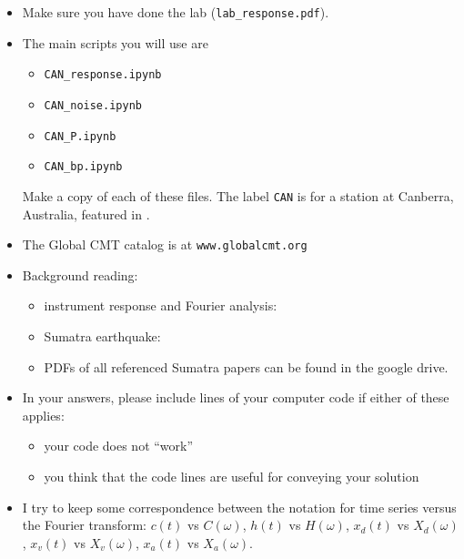 \documentclass[11pt,titlepage,fleqn]{article}
\newcommand{\fft}{h}
\newcommand{\ffw}{H}
\newcommand{\tfileresponse}{{\tt CAN\_response.ipynb}}
\newcommand{\tfilenoise}{{\tt CAN\_noise.ipynb}}
\newcommand{\tfileP}{{\tt CAN\_P.ipynb}}
\newcommand{\tfilebp}{{\tt CAN\_bp.ipynb}}
\begin{document}
\begin{itemize}

\item Make sure you have done the lab (\verb+lab_response.pdf+).

\item The main scripts you will use are
%
\begin{itemize}
\item \tfileresponse\
\item \tfilenoise\
\item \tfileP\
\item \tfilebp\
\end{itemize}
%
Make a copy of each of these files. The label \verb+CAN+ is for a station at Canberra, Australia, featured in \citet[][Figure~1]{Park2005}.


\item The Global CMT catalog is at \verb+www.globalcmt.org+

\item Background reading:

\begin{itemize}
\item instrument response and Fourier analysis: \citet[][Ch.~6]{SteinWysession}
\item Sumatra earthquake: \citep{Lay2005,Ammon2005,Park2005,Ni2005}
\item PDFs of all referenced Sumatra papers can be found in the google drive.
\end{itemize}

\item In your answers, please include lines of your computer code if either of these applies:
%
\begin{itemize}
\item your code does not ``work''
\item you think that the code lines are useful for conveying your solution
\end{itemize}

\item I try to keep some correspondence between the notation for time series versus the Fourier transform: $c(t)$ vs $C(\omega)$, $\fft(t)$ vs $\ffw(\omega)$, $x_d(t)$ vs $X_d(\omega)$, $x_v(t)$ vs $X_v(\omega)$, $x_a(t)$ vs $X_a(\omega)$.

\end{itemize}
\end{document}
